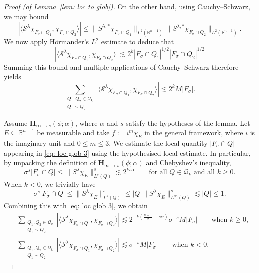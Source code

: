 \documentclass[reqno]{amsart}
\numberwithin{equation}{section}
\newcommand{\B}{\mathbb{B}}
\newcommand{\cQ}{\mathcal{Q}}
\newcommand{\cS}{\mathcal{S}}
\newcommand{\bH}{\mathbf{H}}
\def\inn#1#2{\langle#1,#2\rangle}
\theoremstyle{plain}
\theoremstyle{definition}
\begin{document}
\begin{proof}[Proof (of Lemma~\ref{lem: loc to glob})]
On the other hand, using Cauchy--Schwarz, we may bound
\begin{equation*}
    |\inn{\cS^{\lambda}\chi_{F_{\sigma} \cap Q_1}}{\chi_{F_{\sigma} \cap Q_2}}| \leq \|S^{\lambda, *}\chi_{F_{\sigma} \cap Q_1}\|_{L^2(\B^{n-1})}\|S^{\lambda, *}\chi_{F_{\sigma} \cap Q_2}\|_{L^2(\B^{n-1})}. 
\end{equation*}
We now apply H\"ormander's $L^2$ estimate to deduce that
\begin{equation*}
    |\inn{\cS^{\lambda}\chi_{F_{\sigma} \cap Q_1}}{\chi_{F_{\sigma} \cap Q_2}}| \lesssim 2^k |F_{\sigma} \cap Q_1|^{1/2}|F_{\sigma} \cap Q_2|^{1/2}
\end{equation*}
Summing this bound and multiple applications of Cauchy--Schwarz therefore yields
\begin{equation}\label{eq: loc glob 4}
  \sum_{\substack{Q_1, Q_2 \in \cQ_k \\ Q_1 \sim Q_2}} |\inn{\cS^{\lambda}\chi_{F_{\sigma} \cap Q_1}}{\chi_{F_{\sigma} \cap Q_2}}| \lesssim 2^k M |F_{\sigma}|.
\end{equation}

Assume $\bH_{\infty \to s}(\phi; \alpha)$, where $\alpha$ and $s$ satisfy the hypotheses of the lemma. Let $E \subseteq \B^{n-1}$ be measurable and take $f := i^m \chi_E$ in the general framework, where $i$ is the imaginary unit and $ 0 \leq m  \leq 3$. We estimate the local quantity $|F_{\sigma} \cap Q|$ appearing in \eqref{eq: loc glob 3} using the hypothesised local estimate. In particular, by unpacking the definition of $\bH_{\infty \to s}(\phi; \alpha)$ and Chebyshev's inequality, 
\begin{equation*}
    \sigma^s |F_{\sigma} \cap Q| \leq \|S^{\lambda}\chi_E\|_{L^s(Q)}^s \lesssim 2^{ks\alpha} \qquad \textrm{for all $Q \in \cQ_k$ and all $k\ge 0$.} 
\end{equation*}
When $k<0$, we trivially have
\begin{equation*}
    \sigma^s |F_{\sigma} \cap Q| \leq \|S^{\lambda}\chi_E\|_{L^s(Q)}^s\le |Q|\|S^{\lambda}\chi_E\|_{L^{\infty}(Q)}^s \lesssim |Q|\le 1.
\end{equation*}
Combining this with \eqref{eq: loc glob 3}, we obtain
\begin{equation}\label{eq: loc glob 5}
\begin{split}
    &\sum_{\substack{Q_1, Q_2 \in \cQ_k \\ Q_1 \sim Q_2}} |\inn{\cS^{\lambda}\chi_{F_{\sigma} \cap Q_1}}{\chi_{F_{\sigma} \cap Q_2}}| \lesssim 2^{-k(\frac{n-1}{2} - s\alpha)} \sigma^{-s} M |F_{\sigma}| \qquad \textrm{when $k\ge 0$,}\\
  &\sum_{\substack{Q_1, Q_2 \in \cQ_k \\ Q_1 \sim Q_2}} |\inn{\cS^{\lambda}\chi_{F_{\sigma} \cap Q_1}}{\chi_{F_{\sigma} \cap Q_2}}| \lesssim  \sigma^{-s} M |F_{\sigma}| \qquad \textrm{when $k< 0$.}
\end{split}
\end{equation}


\end{proof}
\end{document}
